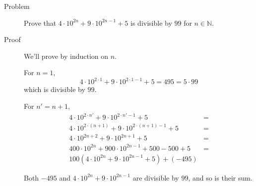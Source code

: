 \begin{description}
\item[Problem] Prove that $4 \cdot 10^{2n} + 9 \cdot 10^{2n-1} + 5$ is
divisible by $99$ for $n \in \mathbb{N}$.

\item[Proof] We'll prove by induction on $n$.

For $n = 1$, $$4 \cdot 10^{2 \cdot 1} + 9 \cdot 10^{2 \cdot 1 - 1} + 5 = 495 =
5 \cdot 99$$ which is divisible by $99$.

For $n' = n + 1$,
\begin{align*}
4 \cdot 10^{2 \cdot n'} + 9 \cdot 10^{2 \cdot n' - 1} + 5 &= \\
4 \cdot 10^{2 \cdot (n + 1)} + 9 \cdot 10^{2 \cdot (n + 1) - 1} + 5 &= \\
4 \cdot 10^{2n + 2} + 9 \cdot 10^{2n + 1} + 5 &= \\
400 \cdot 10^{2n} + 900 \cdot 10^{2n - 1} + 500 - 500 + 5 &= \\
100 \left(4 \cdot 10^{2n} + 9 \cdot 10^{2n - 1} + 5\right) + (- 495)
\end{align*}

Both $-495$ and $4 \cdot 10^{2n} + 9\cdot 10^{2n - 1}$ are divisible by $99$,
and so is their sum.

\end{description}

